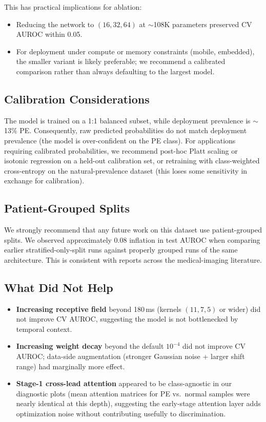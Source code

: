 \documentclass[11pt]{article}
\begin{document}
This has practical implications for ablation:
\begin{itemize}
\item Reducing the network to $(16, 32, 64)$ at $\sim$108K parameters preserved CV AUROC within 0.05.
\item For deployment under compute or memory constraints (mobile, embedded), the smaller variant is likely preferable; we recommend a calibrated comparison rather than always defaulting to the largest model.
\end{itemize}

\subsection{Calibration Considerations}

The model is trained on a 1:1 balanced subset, while deployment prevalence is $\sim$13\% PE. Consequently, raw predicted probabilities do not match deployment prevalence (the model is over-confident on the PE class). For applications requiring calibrated probabilities, we recommend post-hoc Platt scaling or isotonic regression on a held-out calibration set, or retraining with class-weighted cross-entropy on the natural-prevalence dataset (this loses some sensitivity in exchange for calibration).

\subsection{Patient-Grouped Splits}

We strongly recommend that any future work on this dataset use patient-grouped splits. We observed approximately 0.08 inflation in test AUROC when comparing earlier stratified-only-split runs against properly grouped runs of the same architecture. This is consistent with reports across the medical-imaging literature.

\subsection{What Did Not Help}

\begin{itemize}
\item \textbf{Increasing receptive field} beyond 180\,ms (kernels $(11, 7, 5)$ or wider) did not improve CV AUROC, suggesting the model is not bottlenecked by temporal context.
\item \textbf{Increasing weight decay} beyond the default $10^{-4}$ did not improve CV AUROC; data-side augmentation (stronger Gaussian noise + larger shift range) had marginally more effect.
\item \textbf{Stage-1 cross-lead attention} appeared to be class-agnostic in our diagnostic plots (mean attention matrices for PE vs.\ normal samples were nearly identical at this depth), suggesting the early-stage attention layer adds optimization noise without contributing usefully to discrimination.
\end{itemize}
\end{document}
